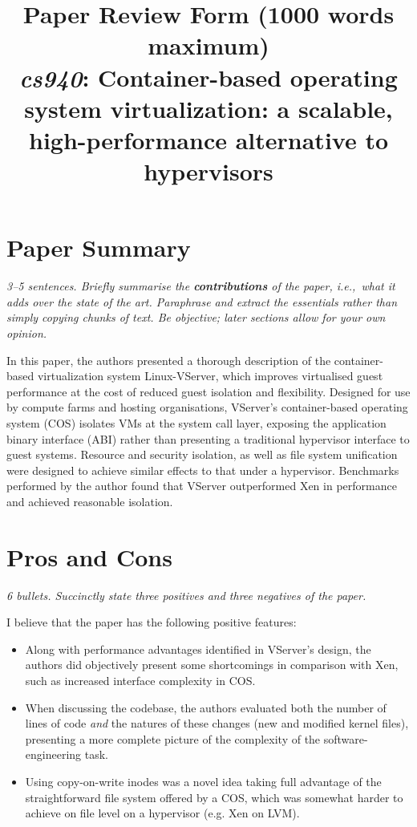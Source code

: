 \documentclass[11pt]{article}
\begin{document}
\title{Paper Review Form (1000 words maximum)\\
  \emph{cs940}: Container-based operating system virtualization: a scalable, high-performance alternative to hypervisors \cite{soltesz2007container}}
\maketitle

\section*{Paper Summary}
\textsl{3--5 sentences. Briefly summarise the {\bf contributions} of the paper, i.e.,~what it adds over the state of the art. Paraphrase and extract the essentials rather than simply copying chunks of text. Be objective; later sections allow for your own opinion.}

In this paper, the authors presented a thorough description of the container-based virtualization system Linux-VServer, which improves virtualised guest performance at the cost of reduced guest isolation and flexibility. Designed for use by compute farms and hosting organisations, VServer's container-based operating system (COS) isolates VMs at the system call layer, exposing the application binary interface (ABI) rather than presenting a traditional hypervisor interface to guest systems. Resource and security isolation, as well as file system unification were designed to achieve similar effects to that under a hypervisor. Benchmarks performed by the author found that VServer outperformed Xen in performance and achieved reasonable isolation.

\section*{Pros and Cons}
\textsl{6 bullets. Succinctly state three positives and three negatives of the paper.}

I believe that the paper has the following positive features:
\begin{itemize}
	\item Along with performance advantages identified in VServer's design, the authors did objectively present some shortcomings in comparison with Xen, such as increased interface complexity in COS.
	\item When discussing the codebase, the authors evaluated both the number of lines of code \emph{and} the natures of these changes (new and modified kernel files), presenting a more complete picture of the complexity of the software-engineering task.
	\item Using copy-on-write inodes was a novel idea taking full advantage of the straightforward file system offered by a COS, which was somewhat harder to achieve on file level on a hypervisor (e.g. Xen on LVM).
\end{itemize}
\end{document}
